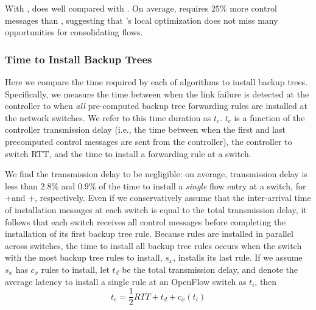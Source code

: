 With \posts, \merge does well compared with \lbs. 
On average, \merge requires $25\%$ more control messages than \lbs, suggesting that \merges's local optimization does not miss many opportunities for consolidating flows.

\subsubsection{Time to Install Backup Trees}
\label{subsubsec:eval-install-time}

Here we compare the time required by each of algorithms to install backup trees.  %
Specifically, we measure the time between when the link failure is detected at the controller to when \emph{all} pre-computed backup tree forwarding rules are installed at the network switches.
We refer to this time duration as $t_c$. 
$t_c$  is a function of the controller transmission delay 
(i.e., the time between when the first and last precomputed control messages are sent from the controller), the controller to switch RTT, and the time to install a forwarding rule at a switch.  

We find the transmission delay to be negligible: on average, transmission delay is less than $2.8\%$ and $0.9\%$ of the time to install a \emph{single} flow entry at a switch,
for \posts+\base and \posts+\merges, respectively.  Even if we conservatively assume that the inter-arrival time of installation messages at each switch is equal to the total transmission delay,
it follows that each switch receives all control messages before completing the installation of its first backup tree rule.  Because rules are installed in parallel across switches, 
the time to install all backup tree rules occurs when the switch with the most backup tree rules to install, $s_x$, installs its last rule.  If we assume $s_x$ has $c_x$ rules to install, let $t_d$ 
be the total transmission delay, and denote the average latency to install a single rule at an OpenFlow switch as $t_i$, then 
     $$t_c = \frac{1}{2}RTT + t_d + c_x(t_i)$$
	 
